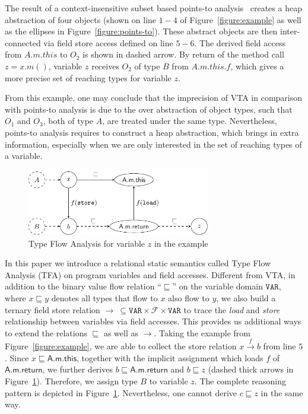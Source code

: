 \documentclass[runningheads]{llncs}
\newcommand\Var{\mathtt{VAR}}
\newcommand{\Field}{\mathcal{F}}
\newcommand{\less}{\sqsubseteq}
\newcommand{\hflow}{\longrightarrow}
\newcommand{\lhflow}[1]{\stackrel{#1}{\hflow}}
\begin{document}
The result of a context-insensitive subset based points-to analysis~\cite{andersen94} creates a heap abstraction of four objects (shown on line $1-4$ of Figure~\ref{figure:example} as well as the ellipses in Figure~\ref{figure:points-to}). These abstract objects are then inter-connected via field store access defined on line $5-6$. The derived field access from $A.m.this$ to $O_2$ is shown in dashed arrow. By return of the method call $z=x.m()$, variable $z$ receives $O_2$ of type $B$ from $A.m.this.f$, which gives a more precise set of reaching types for variable $z$.

From this example, one may conclude that the imprecision of VTA in comparison with points-to analysis is due to the over abstraction of object types, such that $O_1$ and $O_3$, both of type $A$, are treated under the same type. Nevertheless, points-to analysis requires to construct a heap abstraction, which brings in extra information, especially when we are only interested in the set of reaching types of a variable.

\begin{figure}[t!]
\centering
\includegraphics[width=8cm]{tfa.pdf}
\caption{Type Flow Analysis for variable $z$ in the example}\label{fig:tfa}
\end{figure}

In this paper we introduce a relational static semantics called Type Flow Analysis (TFA) on program variables and field accesses. Different from VTA, in addition to the binary value flow relation ``$\less$'' on the variable domain $\Var$, where $x\less y$ denotes all types that flow to $x$ also flow to $y$, we also build a ternary field store relation $\rightarrow\ \subseteq\Var\times\Field\times\Var$ to trace the \emph{load} and \emph{store} relationship between variables via field accesses. This provides us additional ways to extend the relations $\less$ as well as $\rightarrow$. %
Taking the example from Figure~\ref{figure:example}, we are able to collect the store relation $x\lhflow{f}b$ from line $5$. Since $x\less \textsf{A.m.this}$, together with the implicit assignment which loads $f$ of $\textsf{A.m.return}$, we further derives $b\less\textsf{A.m.return}$ and $b\less z$ (dashed thick arrows in Figure~\ref{fig:tfa}). Therefore, we assign type $B$ to variable $z$. The complete reasoning pattern is depicted in Figure~\ref{fig:tfa}. Nevertheless, one cannot derive $c\less z$ in the same way.
\end{document}
